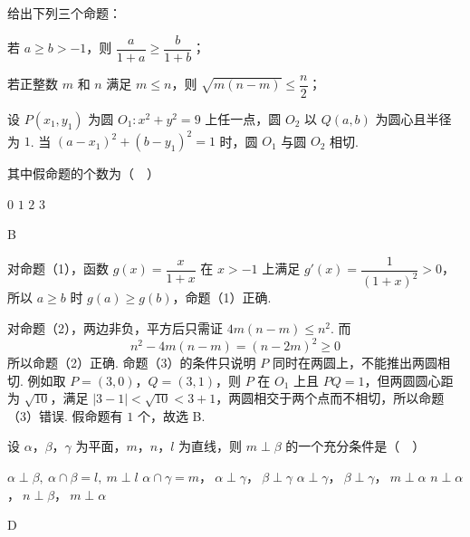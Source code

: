 \begin{problem}
给出下列三个命题：

\begin{circlelist}
\item 若 \(a\geqslant b>-1\)，则 \(\dfrac{a}{1+a}\geqslant\dfrac{b}{1+b}\)；
\item 若正整数 \(m\) 和 \(n\) 满足 \(m\leqslant n\)，则 \(\sqrt{m(n-m)}\leqslant\dfrac n2\)；
\item 设 \(P(x_1,y_1)\) 为圆 \(O_1:x^2+y^2=9\) 上任一点，圆 \(O_2\) 以 \(Q(a,b)\) 为圆心且半径为 \(1\). 当 \((a-x_1)^2+(b-y_1)^2=1\) 时，圆 \(O_1\) 与圆 \(O_2\) 相切.
\end{circlelist}

其中假命题的个数为（\(\quad\)）

\choices
    {\(0\)}
    {\(1\)}
    {\(2\)}
    {\(3\)}
\end{problem}

\begin{answer}
B
\end{answer}

\begin{solution}
对命题（1），函数 \(g(x)=\dfrac{x}{1+x}\) 在 \(x>-1\) 上满足
\(g'(x)=\dfrac{1}{(1+x)^2}>0\)，所以 \(a\geqslant b\) 时
\(g(a)\geqslant g(b)\)，命题（1）正确.

对命题（2），两边非负，平方后只需证 \(4m(n-m)\leqslant n^2\). 而
\[
n^2-4m(n-m)=(n-2m)^2\geqslant0
\]
所以命题（2）正确. 命题（3）的条件只说明 \(P\) 同时在两圆上，不能推出两圆相切.
例如取 \(P=(3,0)\)，\(Q=(3,1)\)，则 \(P\) 在 \(O_1\) 上且
\(PQ=1\)，但两圆圆心距为 \(\sqrt{10}\)，满足
\(|3-1|<\sqrt{10}<3+1\)，两圆相交于两个点而不相切，所以命题（3）错误.
假命题有 \(1\) 个，故选 B.
\end{solution}

\begin{problem}
设 \(\alpha\)，\(\beta\)，\(\gamma\) 为平面，\(m\)，\(n\)，\(l\) 为直线，则
\(m\perp\beta\) 的一个充分条件是（\(\quad\)）

\choices
    {\(\alpha\perp\beta,\ \alpha\cap\beta=l,\ m\perp l\)}
    {\(\alpha\cap\gamma=m\)，\(\ \alpha\perp\gamma\)，\(\ \beta\perp\gamma\)}
    {\(\alpha\perp\gamma\)，\(\ \beta\perp\gamma\)，\(\ m\perp\alpha\)}
    {\(n\perp\alpha\)，\(\ n\perp\beta\)，\(\ m\perp\alpha\)}
\end{problem}

\begin{answer}
D
\end{answer}

